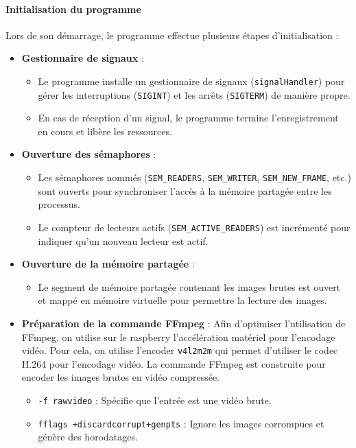 \documentclass[a4paper, 11pt, french]{article}
\begin{document}
\paragraph{Initialisation du programme}
Lors de son démarrage, le programme effectue plusieurs étapes d'initialisation :
\begin{itemize}
    \item \textbf{Gestionnaire de signaux} : 
    \begin{itemize}
        \item Le programme installe un gestionnaire de signaux (\texttt{signalHandler}) pour gérer les interruptions (\texttt{SIGINT}) et les arrêts (\texttt{SIGTERM}) de manière propre.
        \item En cas de réception d'un signal, le programme termine l'enregistrement en cours et libère les ressources.
    \end{itemize}
    \item \textbf{Ouverture des sémaphores} :
    \begin{itemize}
        \item Les sémaphores nommés (\texttt{SEM\_READERS}, \texttt{SEM\_WRITER}, \texttt{SEM\_NEW\_FRAME}, etc.) sont ouverts pour synchroniser l'accès à la mémoire partagée entre les processus.
        \item Le compteur de lecteurs actifs (\texttt{SEM\_ACTIVE\_READERS}) est incrémenté pour indiquer qu'un nouveau lecteur est actif.
    \end{itemize}
    \item \textbf{Ouverture de la mémoire partagée} :
    \begin{itemize}
        \item Le segment de mémoire partagée contenant les images brutes est ouvert et mappé en mémoire virtuelle pour permettre la lecture des images.
    \end{itemize}
    \item \textbf{Préparation de la commande FFmpeg} :
    Afin d'optimiser l'utilisation de FFmpeg, on utilise sur le raspberry l'accélération matériel pour l'encodage vidéo. Pour cela, on utilise l'encoder \texttt{v4l2m2m} qui permet d'utiliser le codec H.264 pour l'encodage vidéo. La commande FFmpeg est construite pour encoder les images brutes en vidéo compressée. 
    \begin{itemize}
        \item \texttt{-f rawvideo} : Spécifie que l'entrée est une vidéo brute.
        \item \texttt{fflags +discardcorrupt+genpts} : Ignore les images corrompues et génère des horodatages.

\end{itemize}
\end{itemize}
\end{document}
